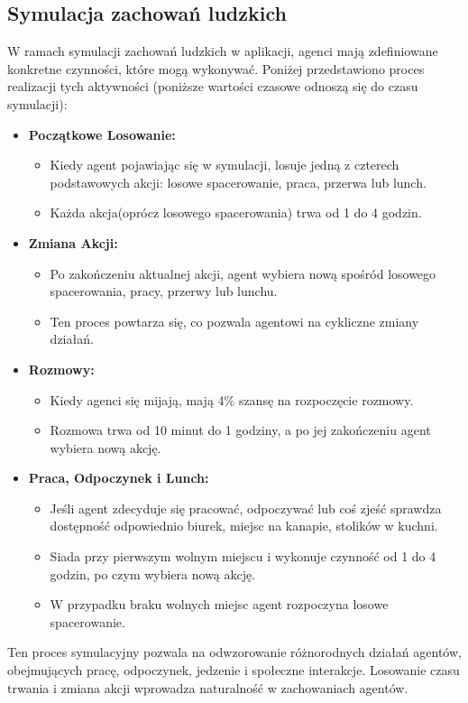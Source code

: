 \subsection{\textbf{Symulacja zachowań ludzkich}}
W ramach symulacji zachowań ludzkich w aplikacji, agenci mają zdefiniowane konkretne czynności, które mogą wykonywać. Poniżej przedstawiono proces realizacji tych aktywności (poniższe wartości czasowe odnoszą się do czasu symulacji):

\begin{itemize}
	\item \textbf{Początkowe Losowanie:}
	\begin{itemize}
		\item Kiedy agent pojawiając się w symulacji, losuje jedną z czterech podstawowych akcji: losowe spacerowanie, praca, przerwa lub lunch.
		\item Każda akcja(oprócz losowego spacerowania) trwa od 1 do 4 godzin.
	\end{itemize}
	
	\item \textbf{Zmiana Akcji:}
	\begin{itemize}
		\item Po zakończeniu aktualnej akcji, agent wybiera nową spośród losowego spacerowania, pracy, przerwy lub lunchu.
		\item Ten proces powtarza się, co pozwala agentowi na cykliczne zmiany działań.
	\end{itemize}
	
	\item \textbf{Rozmowy:}
	\begin{itemize}
		\item Kiedy agenci się mijają, mają 4\% szansę na rozpoczęcie rozmowy.
		\item Rozmowa trwa od 10 minut do 1 godziny, a po jej zakończeniu agent wybiera nową akcję.
	\end{itemize}
	
	\item \textbf{Praca, Odpoczynek i Lunch:}
	\begin{itemize}
		\item Jeśli agent zdecyduje się pracować, odpoczywać lub coś zjeść sprawdza dostępność odpowiednio biurek, miejsc na kanapie, stolików w kuchni.
		\item Siada przy pierwszym wolnym miejscu i wykonuje czynność od 1 do 4 godzin, po czym wybiera nową akcję.
		\item W przypadku braku wolnych miejsc agent rozpoczyna losowe spacerowanie.
	\end{itemize}
\end{itemize}

Ten proces symulacyjny pozwala na odwzorowanie różnorodnych działań agentów, obejmujących pracę, odpoczynek, jedzenie i społeczne interakcje. Losowanie czasu trwania i zmiana akcji wprowadza naturalność w zachowaniach agentów.



